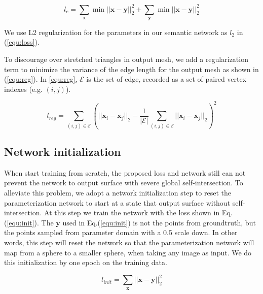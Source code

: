 \begin{equation}
\label{equ:chmf}
l_c = \sum_\mathbf{x} \min||\mathbf{x}-\mathbf{y}||_2^2+\sum_\mathbf{y} \min||\mathbf{x}-\mathbf{y}||_2^2
\end{equation}

 We use L2 regularization for the parameters in our semantic network as $l_2$ in (\ref{equ:loss}).

 To discourage over stretched triangles in output mesh, we add a regularization term to minimize the variance of the edge length for the output mesh as shown in (\ref{equ:reg}). In \ref{equ:reg}, $\mathcal{E}$ is the set of edge, recorded as a set of paired vertex indexes (e.g. $(i,j)$).

\begin{equation}
\label{equ:reg}
l_{reg} = \sum_{(i,j)\in\mathcal{E}}(||\mathbf{x}_i-\mathbf{x}_j||_2 - \frac{1}{|\mathcal{E}|}\sum_{(i,j)\in\mathcal{E} }||\mathbf{x}_i-\mathbf{x}_j||_2)^2
\end{equation}

\subsection{Network initialization}
When start training from scratch, the proposed loss and network still can not prevent the network to output surface with severe global self-intersection. To alleviate this problem, we adopt a network initialization step to reset the parameterization network to start at a state that output surface without self-intersection. At this step we train the network with the loss shown in Eq.(\ref{equ:init}). The $\mathbf{y}$ used in Eq.(\ref{equ:init}) is not the points from groundtruth, but the points sampled from parameter domain with a 0.5 scale down. In other words, this step will reset the network so that the parameterization network will map from a sphere to a smaller sphere, when taking any image as input. We do this initialization by one epoch on the training data. 

\begin{equation}
\label{equ:init}
l_{init} = \sum_\mathbf{x}||\mathbf{x} - \mathbf{y}||_2^2
\end{equation}


